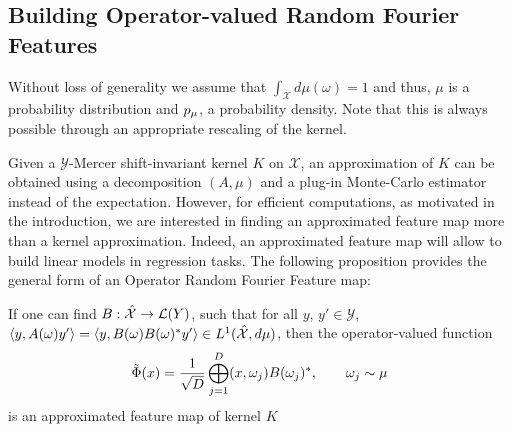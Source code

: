 \subsection{Building Operator-valued Random Fourier Features}
Without loss of generality we assume that $\int_{\mathcal{X}} d\mu(\omega)=1$ and thus, $\mu$ is a probability distribution and $p_{\mu}$, a probability density. Note that this is always possible through an appropriate rescaling of the kernel.

Given a $\mathcal{Y}$-Mercer shift-invariant kernel $K$ on $\mathcal{X}$, an approximation of $K$ can be obtained using a decomposition $(A, \mu)$ and a plug-in Monte-Carlo estimator instead of the expectation. However, for efficient computations, as motivated in the introduction, we are interested in finding an approximated feature map more than a kernel approximation. Indeed, an approximated feature map will allow to build linear models in regression tasks. The following proposition provides the general form of an Operator Random Fourier Feature map:
\begin{proposition}\label{pr:ORFF-map}If one can find $B: \hat{\mathcal{X}} \to \mathcal{L}(Y)$, such that for all $y$, $y'\in\mathcal{Y}$, $\langle y, A(\omega)y'\rangle=\langle y, B(\omega)B(\omega)^*y'\rangle \in L^1(\hat{\mathcal{X}}, d\mu)$, then the operator-valued function
\begin{equation}\label{eq:phitilde}
\tilde{\Phi}(x)= \frac{1}{\sqrt{D}}\operatorname*{\bigoplus}_{j=1}^D(x, \omega_j)B(\omega_j)^*, \qquad \omega_j \sim \mu
\end{equation}
is an approximated feature map of kernel $K$
\end{proposition}

